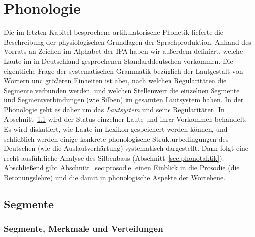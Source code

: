 \chapter{Phonologie}

\label{sec:phonologie}

Die im letzten Kapitel besprochene artikulatorische Phonetik lieferte die Beschreibung der physiologischen Grundlagen der Sprachproduktion.
Anhand des Vorrats an Zeichen im Alphabet der IPA haben wir außerdem definiert, welche Laute im in Deutschland gesprochenen Standarddeutschen vorkommen.
Die eigentliche Frage der systematischen Grammatik bezüglich der Lautgestalt von Wörtern und größeren Einheiten ist aber, nach welchen Regularitäten die Segmente verbunden werden, und welchen Stellenwert die einzelnen Segmente und Segmentverbindungen (wie \zB Silben) im gesamten Lautsystem haben.
In der Phonologie geht es daher um das \textit{Lautsystem} und seine Regularitäten.
In Abschnitt~\ref{sec:segmentalephol} wird der Status einzelner Laute und ihrer Vorkommen behandelt.
Es wird diskutiert, wie Laute im Lexikon gespeichert werden können, und schließlich werden einige konkrete phonologische Strukturbedingungen des Deutschen (wie die Auslautverhärtung) systematisch dargestellt.
Dann folgt eine recht ausführliche Analyse des Silbenbaus (Abschnitt~\ref{sec:phonotaktik}).
Abschließend gibt Abschnitt~\ref{sec:prosodie} einen Einblick in die Prosodie (die Betonungslehre) und die damit in phonologische Aspekte der Wortebene.

\section{Segmente}

\label{sec:segmentalephol}

\subsection{Segmente, Merkmale und Verteilungen}

\label{sec:segmenteverteilungen}
\label{sec:verteilungen}

